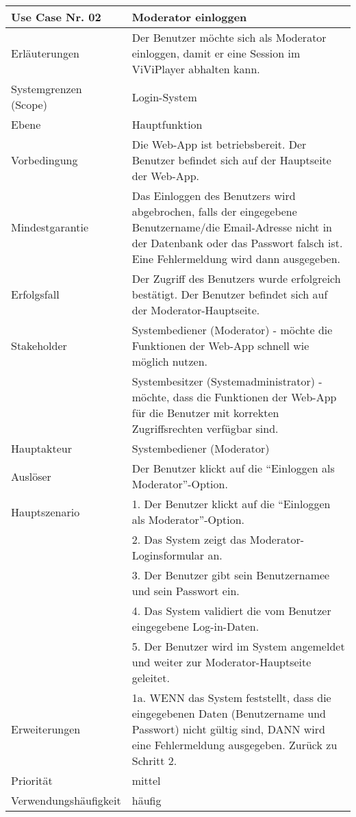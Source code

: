 \begin{tabularx}{\linewidth}{|l|X|}
	\hline
	Use Case Nr. 02			& \textbf{Moderator einloggen} \\ \hline
	Erläuterungen			& Der Benutzer möchte sich als Moderator einloggen, damit er eine 
							  Session im ViViPlayer abhalten kann. \\ \hline
	Systemgrenzen (Scope)	& Login-System \\ \hline
	Ebene					& Hauptfunktion \\ \hline
	Vorbedingung			& Die Web-App ist betriebsbereit. Der Benutzer befindet sich auf der
							  Hauptseite der Web-App. \\ \hline
	Mindestgarantie			& Das Einloggen des Benutzers wird abgebrochen, falls der eingegebene
							  Benutzername/die Email-Adresse nicht in der Datenbank oder das Passwort falsch ist. Eine Fehlermeldung wird dann ausgegeben.
							  \\ \hline
	Erfolgsfall 			& Der Zugriff des Benutzers wurde erfolgreich bestätigt. Der
							  Benutzer befindet sich auf der Moderator-Hauptseite. 
							  \\ \hline
	Stakeholder				& Systembediener (Moderator) - möchte die Funktionen der Web-App 
							  schnell wie möglich nutzen. \\
							& Systembesitzer (Systemadministrator) - möchte, dass die Funktionen 
							  der Web-App für die Benutzer mit korrekten Zugriffsrechten verfügbar sind.\\ \hline
	Hauptakteur				& Systembediener (Moderator) \\ \hline
	Auslöser				& Der Benutzer klickt auf die ``Einloggen als Moderator''-Option.\\ 
							  \hline	
	Hauptszenario			& 1. Der Benutzer klickt auf die ``Einloggen als 
							  Moderator''-Option.\\
							& 2. Das System zeigt das Moderator-Loginsformular an. \\
							& 3. Der Benutzer gibt sein Benutzernamee und sein Passwort ein. \\
							& 4. Das System validiert die vom Benutzer eingegebene Log-in-Daten. \\
							& 5. Der Benutzer wird im System angemeldet und weiter zur Moderator-Hauptseite 
							  geleitet. \\ \hline
	Erweiterungen			& 1a. WENN das System feststellt, dass die eingegebenen Daten
							  (Benutzername und Passwort) nicht gültig sind, DANN wird eine Fehlermeldung ausgegeben. Zurück zu Schritt 2. \\ \hline
	Priorität				& mittel \\ \hline
	Verwendungshäufigkeit	& häufig \\ \hline
\end{tabularx}
